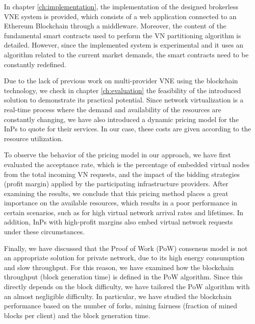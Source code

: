 In chapter \ref{ch:implementation}, the implementation of the designed brokerless VNE system is provided, which consists of a web application connected to an Ethereum Blockchain through a middleware. Moreover, the content of the fundamental smart contracts used to perform the VN partitioning algorithm is detailed. However, since the implemented system is experimental and it uses an algorithm related to the current market demands, the smart contracts need to be constantly redefined.

Due to the lack of previous work on multi-provider VNE using the blockchain technology, we check in chapter \ref{ch:evaluation} the feasibility of the introduced solution to demonstrate its practical potential. Since network virtualization is a real-time process where the demand and availability of the resources are constantly changing, we have also introduced a dynamic pricing model for the InPs to quote for their services. In our case, these costs are given according to the resource utilization.

To observe the behavior of the pricing model in our approach, we have first evaluated the acceptance rate, which is the percentage of embedded virtual nodes from the total incoming VN requests, and the impact of the bidding strategies (profit margin) applied by the participating infrastructure providers. After examining the results, we conclude that this pricing method places a great importance on the available resources, which results in a poor performance in certain scenarios, such as for high virtual network arrival rates and lifetimes. In addition, InPs with high-profit margins also embed virtual network requests under these circumstances.

Finally, we have discussed that the Proof of Work (PoW) consensus model is not an appropriate solution for private network, due to its high energy consumption and slow throughput. For this reason, we have examined how the blockchain throughput (block generation time) is defined in the PoW algorithm. Since this directly depends on the block difficulty, we have tailored the PoW algorithm with an almost negligible difficulty. In particular, we have studied the blockchain performance based on the number of forks, mining fairness (fraction of mined blocks per client) and the block generation time.

